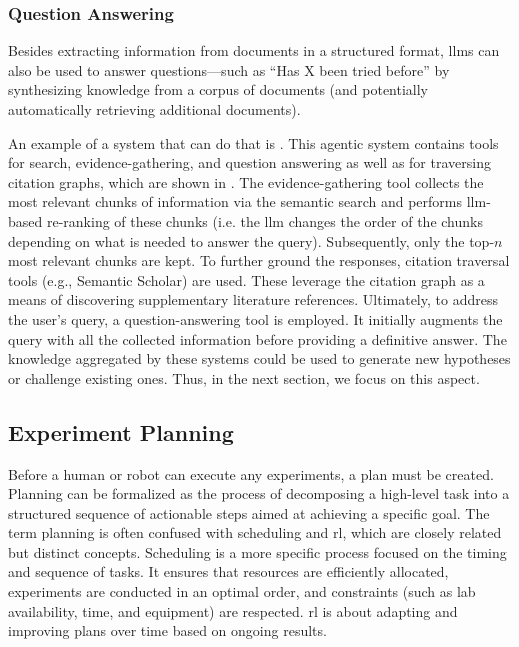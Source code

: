 \subsubsection{Question Answering}
Besides extracting information from documents in a structured format, \glspl{llm} can also be used to answer questions---such as \enquote{Has X been tried before} by synthesizing knowledge from a corpus of documents (and potentially automatically retrieving additional documents). 

An example of a system that can do that is . This agentic system contains tools for search, evidence-gathering, and question answering as well as for traversing citation graphs, which are shown in . The evidence-gathering tool collects the most relevant chunks of information via the semantic search and performs \gls{llm}-based re-ranking of these chunks (i.e. the \gls{llm} changes the order of the chunks depending on what is needed to answer the query).
Subsequently, only the top-$n$ most relevant chunks are kept. To further ground the responses, citation traversal tools (e.g., Semantic Scholar\autocite{kinney2023semantic}) are used. 
These leverage the citation graph as a means of discovering supplementary literature references. Ultimately, to address the user's query, a question-answering tool is employed. It initially augments the query with all the collected information before providing a definitive answer.
The knowledge aggregated by these systems could be used to generate new hypotheses or challenge existing ones. 
Thus, in the next section, we focus on this aspect.





\subsection{Experiment Planning}
\label{sec:planning}
Before a human or robot can execute any experiments, a plan must be created. 
Planning can be formalized as the process of decomposing a high-level task into a structured sequence of actionable steps aimed at achieving a specific goal. 
The term planning is often confused with scheduling and \gls{rl}, which are closely related but distinct concepts. Scheduling is a more specific process focused on the timing and sequence of tasks. 
It ensures that resources are efficiently allocated, experiments are conducted in an optimal order, and constraints (such as lab availability, time, and equipment) are respected.\autocite{kambhampati2023llmplanning} 
\gls{rl} is about adapting and improving plans over time based on ongoing results.\autocite{chen2022deep}

